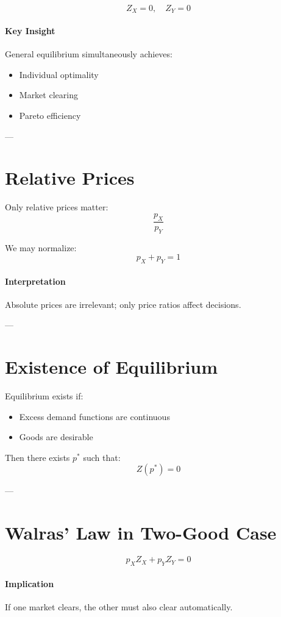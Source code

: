 \[
Z_X = 0, \quad Z_Y = 0
\]

\paragraph{Key Insight}
General equilibrium simultaneously achieves:
\begin{itemize}
    \item Individual optimality
    \item Market clearing
    \item Pareto efficiency
\end{itemize}

---

\section{Relative Prices}

Only relative prices matter:
\[
\frac{p_X}{p_Y}
\]

We may normalize:
\[
p_X + p_Y = 1
\]

\paragraph{Interpretation}
Absolute prices are irrelevant; only price ratios affect decisions.

---

\section{Existence of Equilibrium}

Equilibrium exists if:
\begin{itemize}
    \item Excess demand functions are continuous
    \item Goods are desirable
\end{itemize}

Then there exists $p^*$ such that:
\[
Z(p^*) = 0
\]

---

\section{Walras' Law in Two-Good Case}

\[
p_X Z_X + p_Y Z_Y = 0
\]

\paragraph{Implication}
If one market clears, the other must also clear automatically.

